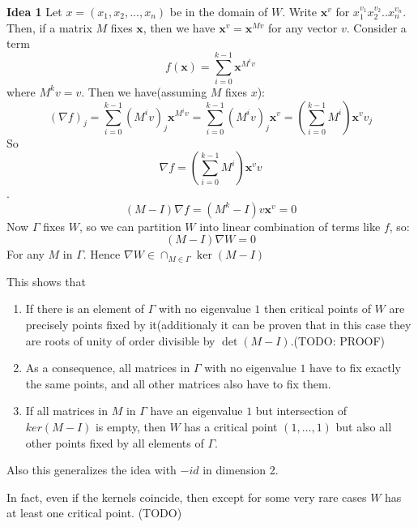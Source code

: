 \documentclass[a4paper]{article}
\begin{document}
\textbf{Idea 1}
Let $x = (x_1, x_2, ..., x_n)$ be in the domain of $W$.
Write $\textbf{x}^v$ for $x_1^{v_1} x_2^{v_2} .. x_n^{v_n}$. Then, if a matrix $M$ fixes $\textbf{x}$, then we have $\textbf{x}^v = \textbf{x}^{Mv}$ for any vector $v$.
Consider a term 
$$f(\textbf{x}) = \sum_{i=0}^{k-1} \textbf{x}^{M^i v}$$
where $M^k v =v$.
Then we have(assuming $M$ fixes $x$):
$$(\nabla f)_j = \sum_{i=0}^{k-1} (M^i v)_j \textbf{x}^{M^i v} = \sum_{i=0}^{k-1} (M^i v)_j \textbf{x}^{v} = (\sum_{i=0}^{k-1} M^i) \textbf{x}^{v} v_j$$
So $$\nabla f = (\sum_{i=0}^{k-1} M^i) \textbf{x}^{v} v$$.
$$(M-I)\nabla f= (M^k-I)v \textbf{x}^{v}= 0$$
Now $\Gamma$ fixes $W$, so we can partition $W$ into linear combination of terms like $f$, so:
$$(M-I)\nabla W = 0$$
For any $M$ in $\Gamma$.
Hence $\nabla W \in \cap_{M \in \Gamma} \ker(M - I)$

This shows that 
\begin{enumerate}
	\item If there is an element of $\Gamma$ with no eigenvalue $1$ then critical points of $W$ are precisely points fixed by it(additionaly it can be proven that in this case they are roots of unity of order divisible by $\det(M-I)$.(TODO: PROOF)
	\item As a consequence, all matrices in $\Gamma$ with no eigenvalue $1$ have to fix exactly the same points, and all other matrices also have to fix them.
	\item If all matrices in $M$ in $\Gamma$ have an eigenvalue $1$ but intersection of $ker(M-I)$ is empty, then $W$ has a critical point $(1, \dots,1)$ but also all other points fixed by all elements of $\Gamma$.
\end{enumerate}

Also this generalizes the idea with $-id$ in dimension 2. 

In fact, even if the kernels coincide, then except for some very rare cases $W$ has at least one critical point. (TODO)
\end{document}
